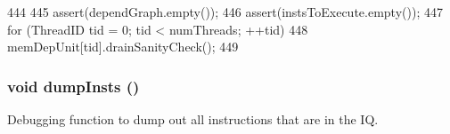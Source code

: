 \begin{DoxyCode}
444 {
445     assert(dependGraph.empty());
446     assert(instsToExecute.empty());
447     for (ThreadID tid = 0; tid < numThreads; ++tid)
448         memDepUnit[tid].drainSanityCheck();
449 }
\end{DoxyCode}
\hypertarget{classInstructionQueue_a80587b4fe043bbe1995536cb3b361588}{
\subsubsection[{dumpInsts}]{\setlength{\rightskip}{0pt plus 5cm}void dumpInsts ()}}
\label{classInstructionQueue_a80587b4fe043bbe1995536cb3b361588}
Debugging function to dump out all instructions that are in the IQ. 


